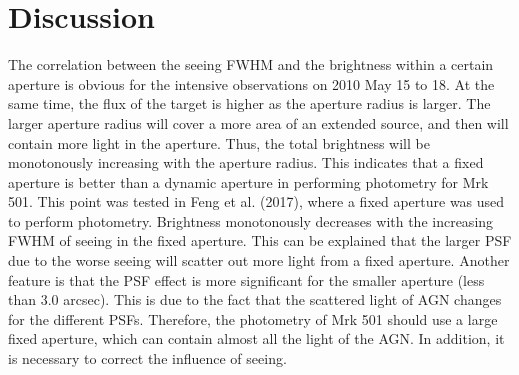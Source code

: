 \documentclass[structabstract]{raa}
\begin{document}
\section{Discussion}
  The correlation between the seeing FWHM and the brightness within a certain aperture is obvious for the intensive observations on
  2010 May 15 to 18. At the same time, the flux of the target is higher as the aperture radius is larger. The larger aperture radius will
  cover a more area of an extended source, and then will contain more light in the aperture. Thus, the total brightness will be monotonously
  increasing with the aperture radius. This indicates that a fixed aperture is better than a dynamic aperture in performing photometry
  for Mrk 501. This point was tested in Feng et al. (2017), where a fixed aperture was used to perform photometry. Brightness monotonously
  decreases with the increasing FWHM of seeing in the fixed aperture. This can be explained that the larger PSF due to the worse seeing
  will scatter out more light from a fixed aperture. Another feature is that the PSF effect is more significant for the smaller aperture (less
  than 3.0 arcsec). This is due to the fact that the scattered light of AGN changes for the different PSFs. Therefore, the photometry of Mrk 501
  should use a large fixed aperture, which can contain almost all the light of the AGN. In addition, it is necessary to correct the influence
  of seeing.
\end{document}
